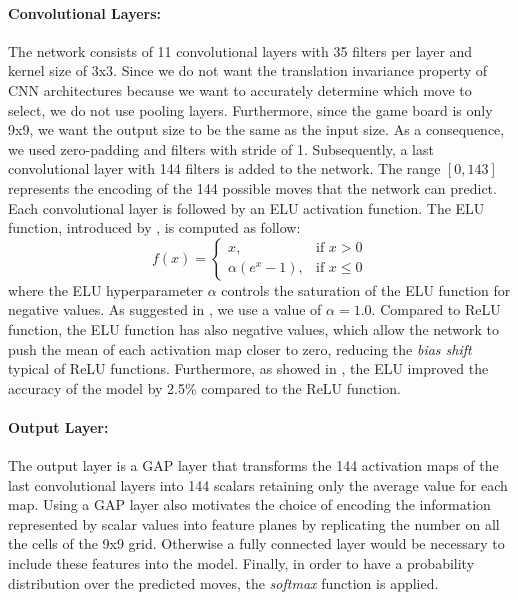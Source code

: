 \paragraph{Convolutional Layers:}
The network consists of 11 convolutional layers with 35 filters per layer and kernel size of 3x3. Since we do not want the translation invariance property of \acs{CNN} architectures because we want to accurately determine which move to select, we do not use pooling layers. Furthermore, since the game board is only 9x9, we want the output size to be the same as the input size. As a consequence, we used zero-padding and filters with stride of 1.
Subsequently, a last convolutional layer with 144 filters is added to the network. The range $\left[0,143\right]$ represents the encoding of the 144 possible moves that the network can predict.
Each convolutional layer is followed by an \acf{ELU} activation function. The \acs{ELU} function, introduced by \textcite{clevert_fast_2015}, is computed as follow:
\begin{equation}
    f(x)= 
            \begin{cases}
                x,                 & \text{if } x > 0\\
                \alpha (e^x-1),     & \text{if } x \leq 0  
            \end{cases}
\end{equation}
where the \acs{ELU} hyperparameter $\alpha$ controls the saturation of the \acs{ELU} function for negative values. As suggested in \cite{clevert_fast_2015}, we use a value of $\alpha=1.0$. Compared to \acf{ReLU} function, the \acs{ELU} function has also negative values, which allow the network to push the mean of each activation map closer to zero, reducing the \textit{bias shift} typical of \acs{ReLU} functions. Furthermore, as showed in \cite{eisen_simulating_2017}, the \acs{ELU} improved the accuracy of the model by 2.5\% compared to the \acs{ReLU} function.  

\paragraph{Output Layer:}
The output layer is a \acs{GAP} layer that transforms the 144 activation maps of the last convolutional layers into 144 scalars retaining only the average value for each map. Using a \acs{GAP} layer also motivates the choice of encoding the information represented by scalar values into feature planes by replicating the number on all the cells of the 9x9 grid. Otherwise a fully connected layer would be necessary to include these features into the model. Finally, in order to have a probability distribution over the predicted moves, the \textit{softmax} function is applied.

